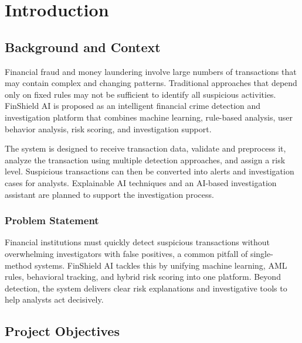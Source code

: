 \documentclass{tietreport}
\author{%
  \texttt{1024170265} Harshit Goyal \\
  \texttt{1024170057} Arnav Gupta \\
  \texttt{1024170274} Dikshit Gupta \\
  \texttt{1024170269} Jasmandeep Sharma%
}
\begin{document}
\maketitle
\tableofcontents


\chapter{Introduction}
\section{Background and Context}

Financial fraud and money laundering involve large numbers of transactions
that may contain complex and changing patterns. Traditional approaches that
depend only on fixed rules may not be sufficient to identify all suspicious
activities. FinShield AI is proposed as an intelligent financial crime
detection and investigation platform that combines machine learning,
rule-based analysis, user behavior analysis, risk scoring, and investigation
support.

The system is designed to receive transaction data, validate and preprocess
it, analyze the transaction using multiple detection approaches, and assign
a risk level. Suspicious transactions can then be converted into alerts and
investigation cases for analysts. Explainable AI techniques and an AI-based
investigation assistant are planned to support the investigation process.

\subsection{Problem Statement}

Financial institutions must quickly detect suspicious transactions without overwhelming investigators with false positives, a common pitfall of single-method systems. FinShield AI tackles this by unifying machine learning, AML rules, behavioral tracking, and hybrid risk scoring into one platform. Beyond detection, the system delivers clear risk explanations and investigative tools to help analysts act decisively.

\section{Project Objectives}
\end{document}
